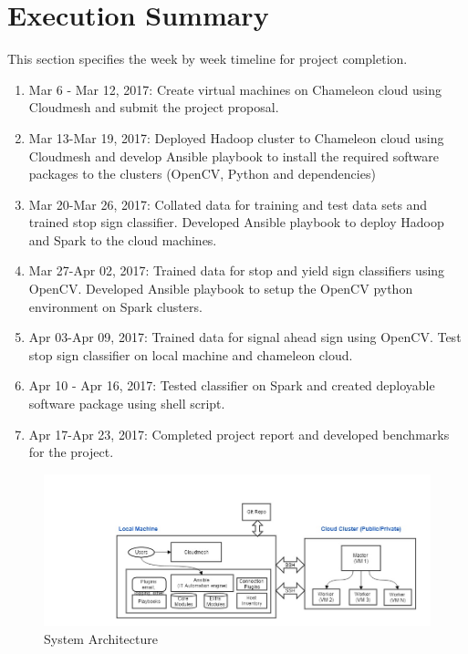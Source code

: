 \documentclass[9pt,twocolumn,twoside]{../../styles/osajnl}
\begin{document}
\section{Execution Summary}
This section specifies the week by week timeline for project
completion.

\begin{enumerate}
\item {Mar 6 - Mar 12, 2017: } Create virtual machines on Chameleon
  cloud using Cloudmesh and submit the project proposal.
\item {Mar 13-Mar 19, 2017: } Deployed Hadoop cluster to Chameleon
  cloud using Cloudmesh and develop Ansible playbook to install the
  required software packages to the clusters (OpenCV, Python and
  dependencies)
\item {Mar 20-Mar 26, 2017: } Collated data for training and test data
  sets and trained stop sign classifier. Developed Ansible playbook to
  deploy Hadoop and Spark to the cloud machines.
\item {Mar 27-Apr 02, 2017: } Trained data for stop and yield sign
  classifiers using OpenCV.  Developed Ansible playbook to setup the
  OpenCV python environment on Spark clusters.
\item {Apr 03-Apr 09, 2017: } Trained data for signal ahead sign using
  OpenCV. Test stop sign classifier on local machine and chameleon
  cloud.
\item {Apr 10 - Apr 16, 2017: } Tested classifier on Spark and created
  deployable software package using shell script.
\item {Apr 17-Apr 23, 2017: } Completed project report and developed
  benchmarks for the project.
\end{enumerate}

\begin{figure}[h]\centering
\includegraphics[width=\linewidth]{images/architecture}
\caption{System Architecture}
\label{fig:arch}
\end{figure}
\end{document}
